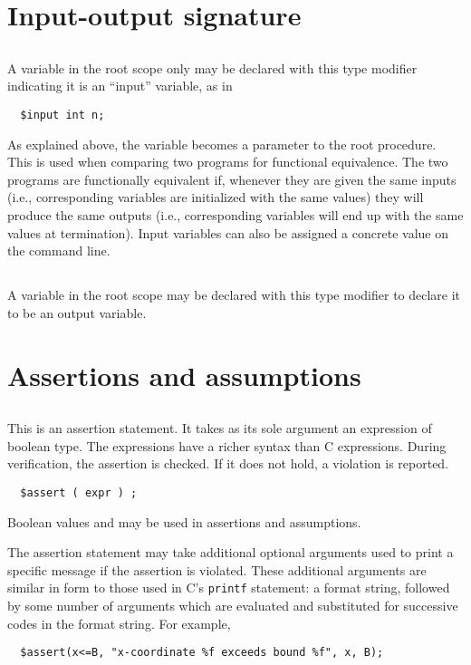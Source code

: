 \section{Input-output signature}

\subsection{\cinput} A variable in the root scope only may be declared
with this type modifier indicating it is an ``input'' variable, as in
\begin{verbatim}
  $input int n;
\end{verbatim}
As explained above, the variable becomes a parameter to the root
procedure.  This is used when comparing two programs for functional
equivalence.  The two programs are functionally equivalent if,
whenever they are given the same inputs (i.e., corresponding \cinput{}
variables are initialized with the same values) they will produce the
same outputs (i.e., corresponding \coutput{} variables will end up
with the same values at termination).  Input variables can also be
assigned a concrete value on the command line.

\subsection{\coutput} A variable in the root scope may be declared
with this type modifier to declare it to be an output variable.

\section{Assertions and assumptions}

\subsection{\cassert} This is an assertion statement.  It takes as its
sole argument an expression of boolean type.  The expressions have a
richer syntax than C expressions.  During verification, the assertion
is checked.  If it does not hold, a violation is reported.
\begin{verbatim}
  $assert ( expr ) ;
\end{verbatim}
Boolean values \ctrue{} and \cfalse{} may be used in assertions
and assumptions.

The assertion statement may take additional optional arguments
used to print a specific message if the assertion is violated.
These additional arguments are similar in form to those used
in C's \texttt{printf} statement: a format string, followed by
some number of arguments which are evaluated and substituted
for successive codes in the format string.  For example,
\begin{verbatim}
  $assert(x<=B, "x-coordinate %f exceeds bound %f", x, B); 
\end{verbatim}


